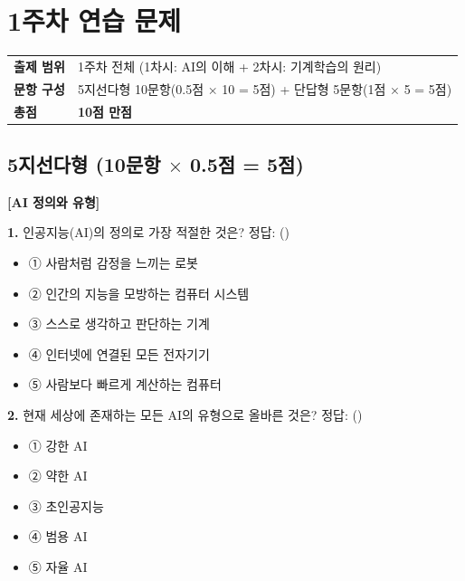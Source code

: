 \documentclass[11pt,a4paper]{article}
\begin{document}
\newpage

\section{ 1주차 연습 문제}

\begin{tcolorbox}[colback=blue!5, colframe=blue!40, title=\emoji{open-book} 출제 안내]
\begin{tabular}{p{3cm}p{10cm}}
\textbf{출제 범위} & 1주차 전체 (1차시: AI의 이해 + 2차시: 기계학습의 원리) \\
\textbf{문항 구성} & 5지선다형 10문항(0.5점 × 10 = 5점) + 단답형 5문항(1점 × 5 = 5점) \\
\textbf{총점} & \textbf{10점 만점} \\
\end{tabular}
\end{tcolorbox}

\subsection{5지선다형 (10문항 \(\times\) 0.5점 = 5점)}

\noindent\textbf{[AI 정의와 유형]}

\bigskip

\noindent\textbf{1.} 인공지능(AI)의 정의로 가장 적절한 것은? \hfill 정답: (\hspace{1.5cm})

\begin{itemize}[leftmargin=2em, label={}]
    \item ① 사람처럼 감정을 느끼는 로봇
    \item ② 인간의 지능을 모방하는 컴퓨터 시스템
    \item ③ 스스로 생각하고 판단하는 기계
    \item ④ 인터넷에 연결된 모든 전자기기
    \item ⑤ 사람보다 빠르게 계산하는 컴퓨터
\end{itemize}

\bigskip

\noindent\textbf{2.} 현재 세상에 존재하는 모든 AI의 유형으로 올바른 것은? \hfill 정답: (\hspace{1.5cm})

\begin{itemize}[leftmargin=2em, label={}]
    \item ① 강한 AI
    \item ② 약한 AI
    \item ③ 초인공지능
    \item ④ 범용 AI
    \item ⑤ 자율 AI
\end{itemize}
\end{document}

